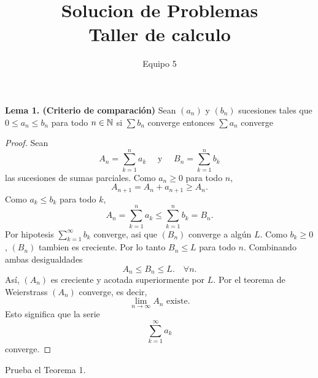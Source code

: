 \documentclass[12pt,a4paper]{article}
\title{Solucion de Problemas\\
Taller de calculo}
\author{Equipo 5}
\begin{document}
    \maketitle

    \textbf{Lema 1. (Criterio de comparación)} Sean $(a_{n})$ y $(b_{n})$ sucesiones tales que
    $0\leq a_{n}\leq b_{n}$ para todo $n\in\mathbb{N}$ si $\sum b_{n}$ converge
    entonces $\sum a_{n}$ converge

    \begin{proof}
        Sean
        \begin{equation*}
            A_{n}=\sum_{k=1}^{n}a_{k}\quad\text{ y }\quad B_{n}=\sum_{k=1}^{n}b_{k}
        \end{equation*}
        las sucesiones de sumas parciales. Como $a_{n}\geq0$ para todo $n$,
        \begin{equation*}
            A_{n+1}=A_{n}+a_{n+1}\geq A_{n}.
        \end{equation*}
        Como $a_{k}\leq b_{k}$ para todo $k$,
        \begin{equation*}
            A_{n}=\sum_{k=1}^{n}a_{k}\leq \sum_{k=1}^{n}b_{k}=B_{n}.
        \end{equation*}
        Por hipotesis $\sum_{k=1}^{\infty}b_{k}$ converge, asi que $(B_{n})$
        converge a algún $L$. Como $b_{k}\geq0$, $(B_{n})$ tambien es creciente.
        Por lo tanto $B_{n}\leq L$ para todo $n$. Combinando ambas desigualdades
        \begin{equation*}
            A_{n}\leq B_{n}\leq L.\quad\forall n.
        \end{equation*}
        Así, $(A_{n})$ es creciente y acotada superiormente por $L$. Por el teorema de
        Weierstrass $(A_{n})$ converge, es decir,
        \begin{equation*}
            \lim_{n\to\infty}A_{n}\text{ existe.}
        \end{equation*}
        Esto significa que la serie
        \begin{equation*}
            \sum_{k=1}^{\infty}a_{k}
        \end{equation*}
        converge.
    \end{proof}

    \begin{ejercicio}
        Prueba el Teorema 1.
    \end{ejercicio}
\end{document}
